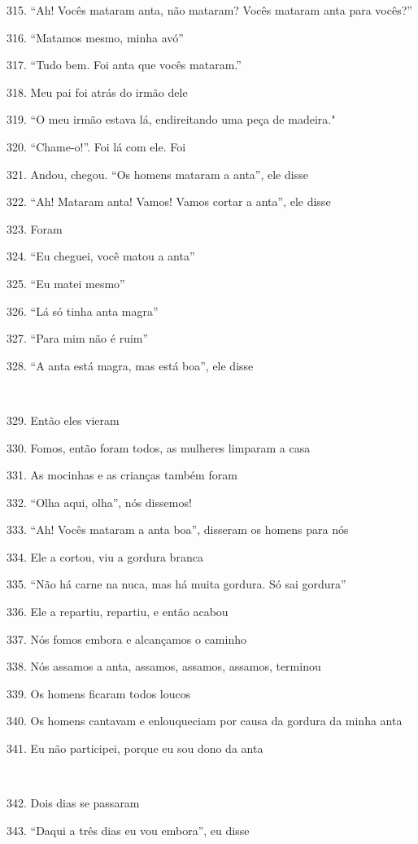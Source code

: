 315. ``Ah! Vocês mataram anta, não mataram? Vocês mataram anta para vocês?''

316. ``Matamos mesmo, minha avó''

317. ``Tudo bem. Foi anta que vocês mataram.''

318. Meu pai foi atrás do irmão dele

319. ``O meu irmão estava lá, endireitando uma peça de madeira."

320. ``Chame-o!''. Foi lá com ele. Foi

321. Andou, chegou. ``Os homens mataram a anta'', ele disse

322. ``Ah! Mataram anta! Vamos! Vamos cortar a anta'', ele disse

323. Foram

324. ``Eu cheguei, você matou a anta''

325. ``Eu matei mesmo''

326. ``Lá só tinha anta magra''

327. ``Para mim não é ruim''

328. ``A anta está magra, mas está boa'', ele disse

~

329. Então eles vieram

330. Fomos, então foram todos, as mulheres limparam a casa

331. As mocinhas e as crianças também foram

332. ``Olha aqui, olha'', nós dissemos!

333. ``Ah! Vocês mataram a anta boa'', disseram os homens para nós

334. Ele a cortou, viu a gordura branca

335. ``Não há carne na nuca, mas há muita gordura. Só sai gordura''

336. Ele a repartiu, repartiu, e então acabou

337. Nós fomos embora e alcançamos o caminho

338. Nós assamos a anta, assamos, assamos, assamos, terminou

339. Os homens ficaram todos loucos

340. Os homens cantavam e enlouqueciam por causa da gordura da minha anta

341. Eu não participei, porque eu sou dono da anta

~

342. Dois dias se passaram

343. ``Daqui a três dias eu vou embora'', eu disse

